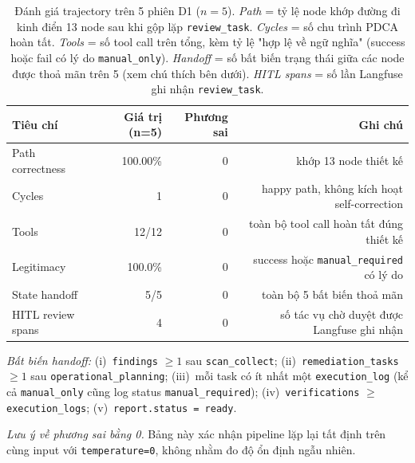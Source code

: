 \begin{table}[H]
  \centering
  \caption{Đánh giá trajectory trên 5 phiên D1 ($n=5$). \textit{Path} = tỷ lệ node khớp đường đi kinh điển 13 node sau khi gộp lặp \texttt{review\_task}. \textit{Cycles} = số chu trình PDCA hoàn tất. \textit{Tools} = số tool call trên tổng, kèm tỷ lệ "hợp lệ về ngữ nghĩa" (success hoặc fail có lý do \texttt{manual\_only}). \textit{Handoff} = số bất biến trạng thái giữa các node được thoả mãn trên 5 (xem chú thích bên dưới). \textit{HITL spans} = số lần Langfuse ghi nhận \texttt{review\_task}.}
  \label{tab:d2_trajectory_eval}
  \small
  \begin{tabular}{lrrr}
    \toprule
    \textbf{Tiêu chí} & \textbf{Giá trị (n=5)} & \textbf{Phương sai} & \textbf{Ghi chú} \\
    \midrule
    Path correctness     & 100.00\% & 0 & khớp 13 node thiết kế \\
    Cycles               & 1        & 0 & happy path, không kích hoạt self-correction \\
    Tools                & 12/12    & 0 & toàn bộ tool call hoàn tất đúng thiết kế \\
    Legitimacy           & 100.0\%  & 0 & success hoặc \texttt{manual\_required} có lý do \\
    State handoff        & 5/5      & 0 & toàn bộ 5 bất biến thoả mãn \\
    HITL review spans    & 4        & 0 & số tác vụ chờ duyệt được Langfuse ghi nhận \\
    \bottomrule
  \end{tabular}

  \vspace{1mm}
  \footnotesize
  \textit{Bất biến handoff:} (i)~\texttt{findings} $\geq 1$ sau \texttt{scan\_collect}; (ii)~\texttt{remediation\_tasks} $\geq 1$ sau \texttt{operational\_planning}; (iii)~mỗi task có ít nhất một \texttt{execution\_log} (kể cả \texttt{manual\_only} cũng log status \texttt{manual\_required}); (iv)~\texttt{verifications} $\geq$ \texttt{execution\_logs}; (v)~\texttt{report.status = ready}.

  \textit{Lưu ý về phương sai bằng 0.} Bảng này xác nhận pipeline lặp lại tất định trên cùng input với \texttt{temperature=0}, không nhằm đo độ ổn định ngẫu nhiên.
\end{table}
